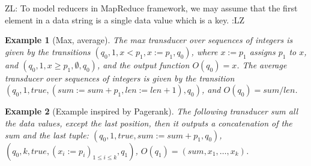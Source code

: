 \documentclass[11pt]{article}
\newtheorem{example}{Example}
\newcommand{\zhilin}[1]{\color{cyan} {ZL: #1 :LZ} \color{black}}
\begin{document}
\zhilin{To model reducers in MapReduce framework, we may assume that the first element in a data string is a single data value which is a key.}

\begin{example}[Max, average]
The max transducer over sequences of integers is given by the transitions $(q_0, 1, x < p_1, x:=p_1, q_0)$, where $x:= p_1$ assigns $p_1$ to $x$, and $(q_0, 1, x \ge p_1 , \emptyset, q_0)$, and the output function $O(q_0)=x$. The average transducer over sequences of integers is given by the transition $(q_0, 1, true, (sum:=sum + p_1, len := len +1), q_0)$, and $O(q_0)=sum / len$. 
\end{example}

\begin{example}[Example inspired by Pagerank]
The following transducer sum all the data values, except the last position, then it outputs a concatenation of the sum and the last tuple: $(q_0, 1, true, sum:= sum + p_1, q_0)$, $(q_0, k, true, (x_i:=p_i)_{1 \le i \le k}, q_1)$, $O(q_1)=(sum, x_1,\dots, x_k)$.
\end{example}
\end{document}
